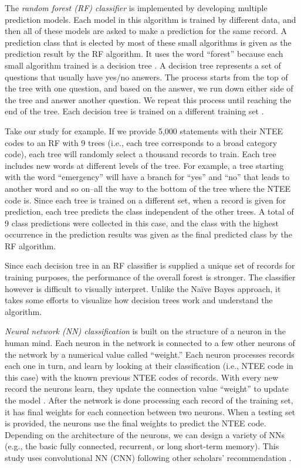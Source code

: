 \documentclass[11pt]{article}
\begin{document}
The \textit{random forest (RF) classifier} is implemented by developing multiple prediction models. Each model in this algorithm is trained by different data, and then all of these models are asked to make a prediction for the same record. A prediction class that is elected by most of these small algorithms is given as the prediction result by the RF algorithm. It uses the word ``forest'' because each small algorithm trained is a decision tree \parencites[83]{QuinlanInductiondecisiontrees1986}. A decision tree represents a set of questions that usually have yes/no answers. The process starts from the top of the tree with one question, and based on the answer, we run down either side of the tree and answer another question. We repeat this process until reaching the end of the tree. Each decision tree is trained on a different training set \parencites[124]{BreimanBaggingpredictors1996}. 

Take our study for example. If we provide 5,000 statements with their NTEE codes to an RF with 9 trees (i.e., each tree corresponds to a broad category code), each tree will randomly select a thousand records to train. Each tree includes new words at different levels of the tree. For example, a tree starting with the word ``emergency'' will have a branch for ``yes'' and ``no'' that leads to another word and so on--all the way to the bottom of the tree where the NTEE code is. Since each tree is trained on a different set, when a record is given for prediction, each tree predicts the class independent of the other trees. A total of 9 class predictions were collected in this case, and the class with the highest occurrence in the prediction results was given as the final predicted class by the RF algorithm. 

Since each decision tree in an RF classifier is supplied a unique set of records for training purposes, the performance of the overall forest is stronger. The classifier however is difficult to visually interpret. Unlike the Na\"ive Bayes approach, it takes some efforts to visualize how decision trees work and understand the algorithm.

\textit{Neural network (NN) classification} is built on the structure of a neuron in the human mind. Each neuron in the network is connected to a few other neurons of the network by a numerical value called ``weight.'' Each neuron processes records each one in turn, and learn by looking at their classification (i.e., NTEE code in this case) with the known previous NTEE codes of records. With every new record the neurons learn, they update the connection value ``weight'' to update the model \parencites[163]{CollobertUnifiedArchitectureNatural2008}. After the network is done processing each record of the training set, it has final weights for each connection between two neurons. When a testing set is provided, the neurons use the final weights to predict the NTEE code. Depending on the architecture of the neurons, we can design a variety of NNs (e.g., the basic fully connected, recurrent, or long short-term memory). This study uses convolutional NN (CNN) following other scholars' recommendation \parencite{ZhangSensitivityAnalysisPractitioners2015}.
\end{document}
